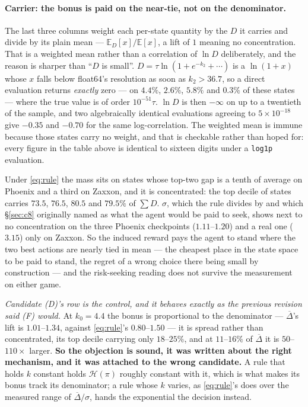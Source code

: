 \documentclass{article}
\newcommand{\E}{\mathbb{E}}
\newcommand{\h}{\mathcal{H}}
\newcommand{\gapbar}{\overline{\Delta}}
\newcommand{\srank}{\sigma}
\begin{document}
\paragraph{Carrier: the bonus is paid on the near-tie, not on the denominator.} The last three
columns weight each per-state quantity by the $D$ it carries and divide by its plain mean ---
$\E_D[x]/\E[x]$, a lift of $1$ meaning no concentration. That is a weighted mean rather than a
correlation of $\ln D$ deliberately, and the reason is sharper than ``$D$ is small''.
$D = \tau\ln(1 + e^{-k_2} + \cdots)$ is a $\ln(1+x)$ whose $x$ falls below float64's resolution as
soon as $k_2 > 36.7$, so a direct evaluation returns \emph{exactly} zero --- on $4.4\%$, $2.6\%$,
$5.8\%$ and $0.3\%$ of these states --- where the true value is of order $10^{-51}\tau$. $\ln D$ is
then $-\infty$ on up to a twentieth of the sample, and two algebraically identical evaluations
agreeing to $5\times10^{-18}$ give $-0.35$ and $-0.70$ for the same log-correlation. The weighted
mean is immune because those states carry no weight, and that is checkable rather than hoped for:
every figure in the table above is identical to sixteen digits under a \texttt{log1p} evaluation.

Under \eqref{eq:rule} the mass sits on states whose top-two gap is a tenth of average on Phoenix
and a third on Zaxxon, and it is concentrated: the top decile of states carries $73.5$, $76.5$,
$80.5$ and $79.5\%$ of $\sum D$. $\srank$, which the rule divides by and which \S\ref{sec:c8}
originally named as what the agent would be paid to seek, shows next to no concentration on
the three Phoenix checkpoints ($1.11$--$1.20$) and a real one ($3.15$) only on Zaxxon. So the induced reward pays
the agent to stand where the two best actions are nearly tied in mean --- the cheapest place in
the state space to be paid to stand, the regret of a wrong choice there being small by
construction --- and the risk-seeking reading does not survive the measurement on either game.

\emph{Candidate (D)'s row is the control, and it behaves exactly as the previous revision said
(F) would.} At $k_0 = 4.4$ the bonus is proportional to the denominator --- $\gapbar$'s lift is
$1.01$--$1.34$, against \eqref{eq:rule}'s $0.80$--$1.50$ --- it is spread rather than
concentrated, its top decile carrying only $18$--$25\%$, and at $11$--$16\%$ of $\gapbar$ it is
$50$--$110\times$ larger. \textbf{So the objection is sound, it was written about the right
mechanism, and it was attached to the wrong candidate.} A rule that holds $k$ constant holds
$\h(\pi)$ roughly constant with it, which is what makes its bonus track its denominator; a rule
whose $k$ varies, as \eqref{eq:rule}'s does over the measured range of $\gapbar/\srank$, hands the
exponential the decision instead.
\end{document}
